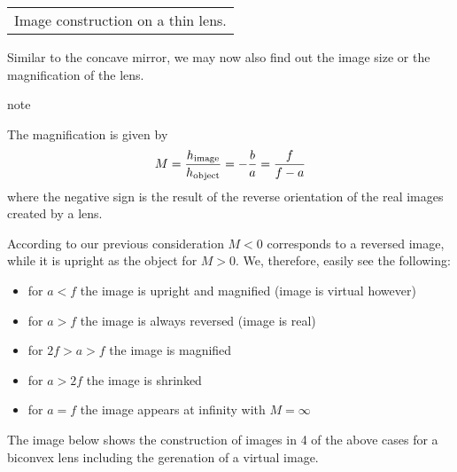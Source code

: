 \documentclass[letterpaper,10pt,english]{sphinxmanual}
\begin{document}
\begin{savenotes}\sphinxattablestart
\centering
\begin{tabulary}{\linewidth}[t]{|T|}
\hline
\sphinxstyletheadfamily 
{}
\\
\hline
{} Image construction on a thin lens.
\\
\hline
\end{tabulary}
\par
\sphinxattableend\end{savenotes}

Similar to the concave mirror, we may now also find out the image size or the magnification of the lens.

\begin{sphinxadmonition}{note}{}\unskip
{}

The magnification is given by
\begin{equation*}
\begin{split}M=\frac{h_{\rm image}}{h_{\rm object}}=-\frac{b}{a}=\frac{f}{f-a}\end{split}
\end{equation*}
where the negative sign is the result of the reverse orientation of the real images created by a lens.
\end{sphinxadmonition}

According to our previous consideration \(M<0\) corresponds to a reversed image, while it is upright as the object for \(M>0\). We, therefore, easily see the following:
\begin{itemize}
\item {} 
for \(a<f\) the image is upright and magnified (image is virtual however)

\item {} 
for \(a>f\) the image is always reversed (image is real)

\item {} 
for \(2f>a>f\) the image is magnified

\item {} 
for \(a>2f\) the image is shrinked

\item {} 
for \(a=f\) the image appears at infinity with \(M=\infty\)

\end{itemize}

The image below shows the construction of images in 4 of the above cases for a bi\sphinxhyphen{}convex lens including the gerenation of a virtual image.
\end{document}
